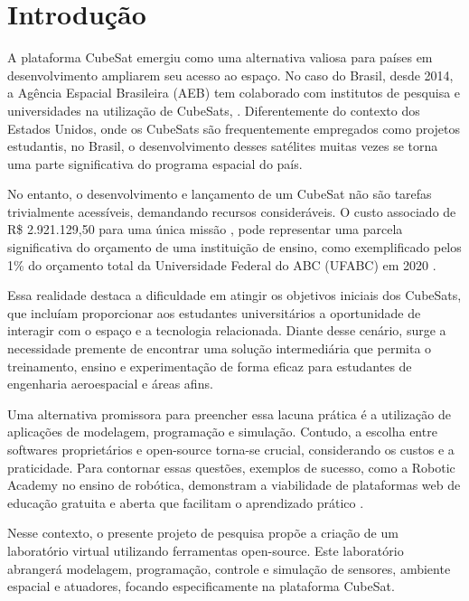 
\chapter*[Introdução]{Introdução}

A plataforma CubeSat emergiu como uma alternativa valiosa para países em desenvolvimento ampliarem seu acesso ao espaço. No caso do Brasil, desde 2014, a Agência Espacial Brasileira (AEB) tem colaborado com institutos de pesquisa e universidades na utilização de CubeSats, \cite{Santos2018}. Diferentemente do contexto dos Estados Unidos, onde os CubeSats são frequentemente empregados como projetos estudantis, no Brasil, o desenvolvimento desses satélites muitas vezes se torna uma parte significativa do programa espacial do país.

No entanto, o desenvolvimento e lançamento de um CubeSat não são tarefas trivialmente acessíveis, demandando recursos consideráveis. O custo associado de R\$ 2.921.129,50 para uma única missão \cite{CGEE2018}, pode representar uma parcela significativa do orçamento de uma instituição de ensino, como exemplificado pelos 1\% do orçamento total da Universidade Federal do ABC (UFABC) em 2020 \cite{wikipedia2023}.

Essa realidade destaca a dificuldade em atingir os objetivos iniciais dos CubeSats, que incluíam proporcionar aos estudantes universitários a oportunidade de interagir com o espaço e a tecnologia relacionada. Diante desse cenário, surge a necessidade premente de encontrar uma solução intermediária que permita o treinamento, ensino e experimentação de forma eficaz para estudantes de engenharia aeroespacial e áreas afins.

Uma alternativa promissora para preencher essa lacuna prática é a utilização de aplicações de modelagem, programação e simulação. Contudo, a escolha entre softwares proprietários e open-source torna-se crucial, considerando os custos e a praticidade. Para contornar essas questões, exemplos de sucesso, como a Robotic Academy no ensino de robótica, demonstram a viabilidade de plataformas web de educação gratuita e aberta que facilitam o aprendizado prático \cite{canas2020ros}.

Nesse contexto, o presente projeto de pesquisa propõe a criação de um laboratório virtual utilizando ferramentas open-source. Este laboratório abrangerá modelagem, programação, controle e simulação de sensores, ambiente espacial e atuadores, focando especificamente na plataforma CubeSat.

